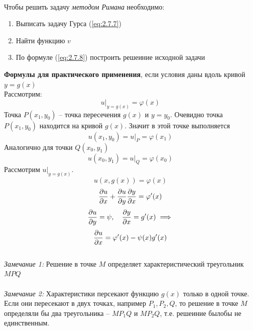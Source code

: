 \documentclass[../main.tex]{subfiles}
\begin{document}
\\
Чтобы решить задачу \textit{методом Римана} необходимо:
\begin{enumerate}
    \item Выписать задачу Гурса (\ref{eq:2.7.7}) 
    \item Найти функцию $v$
    \item По формуле (\ref*{eq:2.7.8}) построить решеиние исходной задачи
\end{enumerate}
\textbf{Формулы для практического применения}, если условия даны вдоль кривой $y=g(x)$\\
Рассмотрим:
$$ u|_{y=g(x)} = \varphi(x) $$
Точка $P(x_1,y_0)$ -- точка пересечения $g(x)$ и $y=y_0$. Очевидно точка $P(x_1,y_0)$ находится на кривой $g(x)$.
Значит в этой точке выполняется 
$$ u(x_1,y_0) = u|_{P}= \varphi(x_1) $$
Аналогично для точки $Q(x_0,y_1)$
$$ u(x_0,y_1) = u|_{Q}= \varphi(x_0) $$
Рассмотрим $u|_{y=g(x)}$.
$$ u(x,g(x)) = \varphi(x) $$
$$ \frac{\partial u}{\partial x} + \frac{\partial u}{\partial y}\frac{\partial y}{\partial x} = \varphi'(x) $$
$$ \frac{\partial u}{\partial y} = \psi, \quad \frac{\partial y}{\partial x} = g'(x) \implies $$
$$ \frac{\partial u}{\partial x} = \varphi'(x) - \psi(x)g'(x)$$
\\
\textit{Замечание 1:} Решение в точке $M$ определяет характеристический треугольник $MPQ$\\
\\
\textit{Замечание 2:} Характеристики персекают функцию $g(x)$ только в одной точке.
Если они пересекают в двух точках, например $P_1, P_2, Q$, то решение в точке $M$ 
определяли бы два треугольника -- $MP_1Q$ и $MP_2Q$, т.е. решеиние былобы не единственным.
\end{document}
